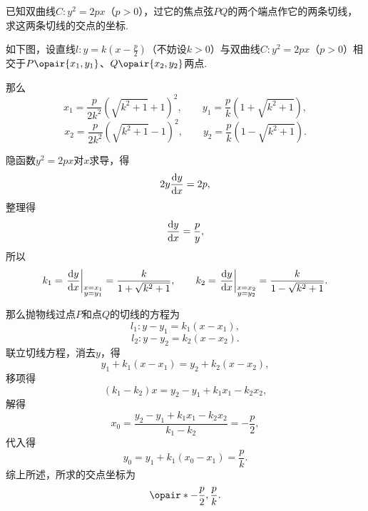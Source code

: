 \begin{example}
已知双曲线\(C: y^2 = 2px\)（\(p>0\)），过它的焦点弦\(PQ\)的两个端点作它的两条切线，求这两条切线的交点的坐标.
\begin{solution}
如下图，设直线\(l: y=k\left(x-\frac{p}{2}\right)\)（不妨设\(k>0\)）与双曲线\(C: y^2 = 2px\)（\(p>0\)）相交于\(P\opair{x_1,y_1}\)、\(Q\opair{x_2,y_2}\)两点.
\begin{center}
\end{center}
那么\[
x_1 = \frac{p}{2 k^2} (\sqrt{k^2+1} + 1)^2,
\qquad
y_1 = \frac{p}{k} (1+\sqrt{k^2+1}),
\]\[
x_2 = \frac{p}{2 k^2} (\sqrt{k^2+1} - 1)^2,
\qquad
y_2 = \frac{p}{k} (1-\sqrt{k^2+1}).
\]

隐函数\(y^2 = 2px\)对\(x\)求导，得\[
2 y \dv{y}{x} = 2 p,
\]整理得\[
\dv{y}{x} = \frac{p}{y},
\]所以\[
k_1 = \eval{\dv{y}{x}}_{\substack{x=x_1\\y=y_1}}
= \frac{k}{1+\sqrt{k^2+1}},
\qquad
k_2 = \eval{\dv{y}{x}}_{\substack{x=x_2\\y=y_2}}
= \frac{k}{1-\sqrt{k^2+1}}.
\]

那么抛物线过点\(P\)和点\(Q\)的切线的方程为\[
l_1: y-y_1 = k_1 (x-x_1),
\]\[
l_2: y-y_2 = k_2 (x-x_2).
\]联立切线方程，消去\(y\)，得\[
y_1 + k_1(x - x_1) = y_2 + k_2(x - x_2),
\]移项得\[
(k_1 - k_2) x = y_2 - y_1 + k_1 x_1 - k_2 x_2,
\]解得\[
x_0 = \frac{y_2 - y_1 + k_1 x_1 - k_2 x_2}{k_1 - k_2}
= -\frac{p}{2},
\]代入得\[
y_0 = y_1 + k_1(x_0 - x_1)
= \frac{p}{k}.
\]综上所述，所求的交点坐标为\[
\opair*{-\frac{p}{2},\frac{p}{k}}.
\]
\end{solution}
\end{example}


